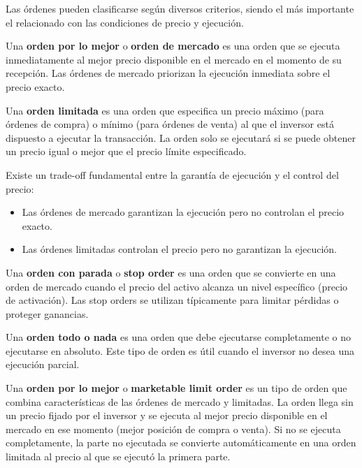 Las órdenes pueden clasificarse según diversos criterios, siendo el más importante el relacionado con las condiciones de precio y ejecución.

\begin{definicion}
Una \textbf{orden por lo mejor} o \textbf{orden de mercado} es una orden que se ejecuta inmediatamente al mejor precio disponible en el mercado en el momento de su recepción. Las órdenes de mercado priorizan la ejecución inmediata sobre el precio exacto.
\end{definicion}

\begin{definicion}
Una \textbf{orden limitada} es una orden que especifica un precio máximo (para órdenes de compra) o mínimo (para órdenes de venta) al que el inversor está dispuesto a ejecutar la transacción. La orden solo se ejecutará si se puede obtener un precio igual o mejor que el precio límite especificado.
\end{definicion}

\begin{proposicion}
Existe un trade-off fundamental entre la garantía de ejecución y el control del precio:
\begin{itemize}
\item Las órdenes de mercado garantizan la ejecución pero no controlan el precio exacto.
\item Las órdenes limitadas controlan el precio pero no garantizan la ejecución.
\end{itemize}
\end{proposicion}

\begin{definicion}
Una \textbf{orden con parada} o \textbf{stop order} es una orden que se convierte en una orden de mercado cuando el precio del activo alcanza un nivel específico (precio de activación). Las stop orders se utilizan típicamente para limitar pérdidas o proteger ganancias.
\end{definicion}

\begin{definicion}
Una \textbf{orden todo o nada} es una orden que debe ejecutarse completamente o no ejecutarse en absoluto. Este tipo de orden es útil cuando el inversor no desea una ejecución parcial.
\end{definicion}

\begin{definicion}
Una \textbf{orden por lo mejor} o \textbf{marketable limit order} es un tipo de orden que combina características de las órdenes de mercado y limitadas. La orden llega sin un precio fijado por el inversor y se ejecuta al mejor precio disponible en el mercado en ese momento (mejor posición de compra o venta). Si no se ejecuta completamente, la parte no ejecutada se convierte automáticamente en una orden limitada al precio al que se ejecutó la primera parte.
\end{definicion}

